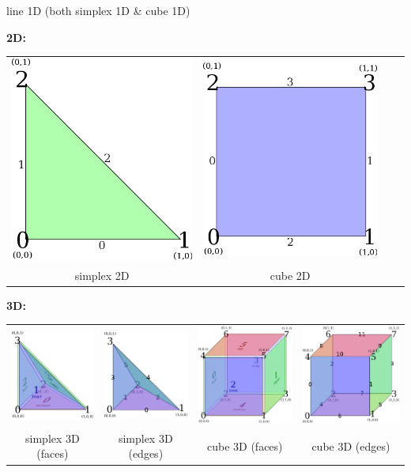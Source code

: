 \documentclass[aspectratio=169,11pt]{beamer}
\theoremstyle{definition}
\begin{document}
\begin{frame}[fragile]
\begin{onlyenv}
\begin{center}
      line 1D (both simplex 1D \& cube 1D)
    \end{center}
    \textbf{2D:}
    \begin{center}
      \begin{tabular}{cccc}
        \includegraphics[height=0.23\linewidth]{gg_triangle} &
        \includegraphics[height=0.23\linewidth]{gg_quadrilateral}\\
        simplex 2D & cube 2D\\
      \end{tabular}
    \end{center}
    \textbf{3D:}
    \begin{center}
      \begin{tabular}{cccc}
        \includegraphics[height=0.23\linewidth]{gg_tetrahedron} &
        \includegraphics[height=0.23\linewidth]{gg_tetrahedron_edges} &
        \includegraphics[height=0.23\linewidth]{gg_hexahedron} &
        \includegraphics[height=0.23\linewidth]{gg_hexahedron_edges}
        \\
        simplex 3D (faces) & simplex 3D (edges) & cube 3D (faces) & cube 3D (edges)\\


\end{tabular}
\end{center}
\end{onlyenv}
\end{frame}
\end{document}
